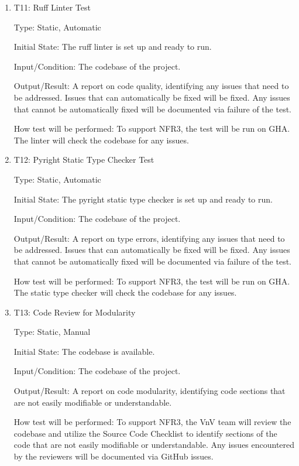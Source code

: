 \documentclass[12pt, titlepage]{article}
\begin{document}
\begin{enumerate}

\item{T11: Ruff Linter Test\\}

Type: Static, Automatic

Initial State: The ruff linter is set up and ready to run.

Input/Condition: The codebase of the \progname{} project.

Output/Result: A report on code quality, identifying any issues that need to be
addressed. Issues that can automatically be fixed will be fixed. Any issues that
cannot be automatically fixed will be documented via failure of the test.

How test will be performed: To support NFR3, the test will be run on GHA. The
linter will check the codebase for any issues.

\item{T12: Pyright Static Type Checker Test\\}

Type: Static, Automatic

Initial State: The pyright static type checker is set up and ready to run.

Input/Condition: The codebase of the \progname{} project.

Output/Result: A report on type errors, identifying any issues that need to be
addressed. Issues that can automatically be fixed will be fixed. Any issues that
cannot be automatically fixed will be documented via failure of the test.

How test will be performed: To support NFR3, the test will be run on GHA. The
static type checker will check the codebase for any issues.

\item{T13: Code Review for Modularity\\}

Type: Static, Manual
					
Initial State: The codebase is available.
					
Input/Condition: The codebase of the \progname{} project.
					
Output/Result: A report on code modularity, identifying code sections that are
not easily modifiable or understandable.
					
How test will be performed: To support NFR3, the VnV team will review the codebase
and utilize the Source Code Checklist \citep{CodeChecklist} to identify
sections of the code that are not easily modifiable or understandable. Any issues
encountered by the reviewers will be documented via GitHub issues.
\end{enumerate}
\end{document}
